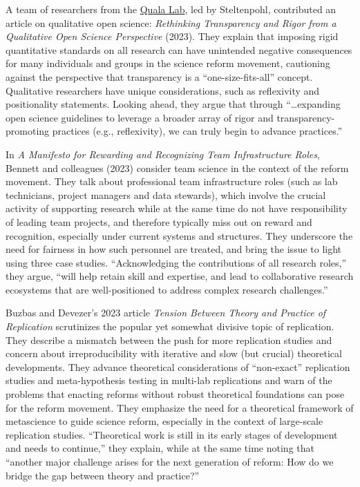 \documentclass[authordate, editorial,noabstract]{jote-new-article}
\begin{document}
	A team of researchers from the \href{https://qualalab.org/}{Quala Lab}, led by Steltenpohl, contributed an article on qualitative open science: \emph{Rethinking Transparency and Rigor from a Qualitative Open Science Perspective} (2023). They explain that imposing rigid quantitative standards on all research can have unintended negative consequences for many individuals and groups in the science reform movement, cautioning against the perspective that transparency is a “one-size-fits-all” concept. Qualitative researchers have unique considerations, such as reflexivity and positionality statements. Looking ahead, they argue that through “…expanding open science guidelines to leverage a broader array of rigor and transparency-promoting practices (e.g., reflexivity), we can truly begin to advance practices.”



	In \emph{A Manifesto for Rewarding and Recognizing Team Infrastructure Roles}, Bennett and colleagues (2023) consider team science in the context of the reform movement. They talk about professional team infrastructure roles (such as lab technicians, project managers and data stewards), which involve the crucial activity of supporting research while at the same time do not have responsibility of leading team projects, and therefore typically miss out on reward and recognition, especially under current systems and structures. They underscore the need for fairness in how such personnel are treated, and bring the issue to light using three case studies. “Acknowledging the contributions of all research roles,” they argue, “will help retain skill and expertise, and lead to collaborative research ecosystems that are well-positioned to address complex research challenges.”



	Buzbas and Devezer's 2023 article \emph{Tension Between Theory and Practice of Replication} scrutinizes the popular yet somewhat divisive topic of replication. They describe a mismatch between the push for more replication studies and concern about irreproducibility with iterative and slow (but crucial) theoretical developments. They advance theoretical considerations of “non-exact” replication studies and meta-hypothesis testing in multi-lab replications and warn of the problems that enacting reforms without robust theoretical foundations can pose for the reform movement. They emphasize the need for a theoretical framework of metascience to guide science reform, especially in the context of large-scale replication studies. “Theoretical work is still in its early stages of development and needs to continue,” they explain, while at the same time noting that “another major challenge arises for the next generation of reform: How do we bridge the gap between theory and practice?”
\end{document}
